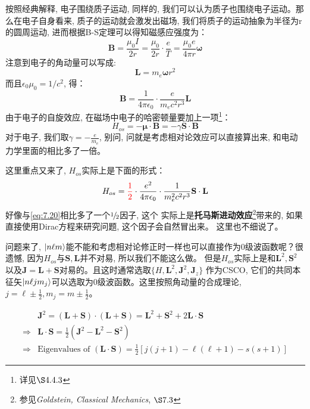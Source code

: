 \documentclass[a4paper,zihao=-4,linespread=1]{ctexrep}
\begin{document}
    按照经典解释, 电子围绕质子运动, 同样的, 我们可以认为质子也围绕电子运动。那么在电子自身看来, 质子的运动就会激发出磁场, 我们将质子的运动抽象为半径为r的圆周运动,
    进而根据B-S定理可以得知磁感应强度为：
    \begin{equation}
        \mathbf{B}=\frac{\mu_0I}{2r}=\frac{\mu_0}{2r}\cdot\frac{e}{T}=\frac{\mu_0e}{4\pi r}\mathbf{\omega}
    \end{equation}
    注意到电子的角动量可以写成:
    \[\mathbf{L}=m_e\mathbf{\omega}r^2\]
    而且$\epsilon_0\mu_0=1/c^2$, 得：
    \begin{equation}
        \mathbf{B}=\frac{1}{4\pi\epsilon_0}\cdot\frac{e}{m_ec^2r^3}\mathbf{L}
    \end{equation}
    由于电子的自旋效应, 在磁场中电子的哈密顿量要加上一项\footnote{详见$\S4.4.3$}：
    \begin{equation}
        \label{eq:7.20}
        H_{os}=-\mathbf{\mu}\cdot\mathbf{B}=-\gamma \mathbf{S}\cdot\mathbf{B}
    \end{equation}
    对于电子, 我们取$\gamma=-\frac{e}{m_e}$, 别问, 问就是考虑相对论效应可以直接算出来, 和电动力学里面的相比多了一倍。

    这里重点又来了, $H_{os}$实际上是下面的形式：
    \begin{equation}
    	\label{eq:7.22}
        H_{os}={\color{red} \frac{1}{2}}\cdot\frac{e^2}{4\pi\epsilon_0}\cdot\frac{1}{m_e^2c^2r^3}\mathbf{S}\cdot\mathbf{L}
    \end{equation}
    好像与\ref{eq:7.20}相比多了一个${\raise0.5ex\hbox{$\scriptstyle 1$}\kern-0.1em/\kern-0.15em\lower0.25ex\hbox{$\scriptstyle 2$}}$因子, 这个
    实际上是\textbf{托马斯进动效应}\footnote{参见{\itshape Goldstein, Classical Mechanics}, $\S7.3$}带来的, 如果直接使用Dirac方程来研究问题, 这个因子会自然冒出来。
    这里也不细说了。

    问题来了, $\ket{n\ell m}$能不能和考虑相对论修正时一样也可以直接作为0级波函数呢？很遗憾, 因为$H_{os}$与$\mathbf{S},\mathbf{L}$并不对易, 所以我们不能这么做。
    但是$H_{os}$实际上是和$\mathbf{L}^2,\mathbf{S}^2$以及$\mathbf{J}=\mathbf{L}+\mathbf{S}$对易的。且这时通常选取$\{H,\mathbf{L}^2,\mathbf{J}^2,\mathbf{J}_z\}$
    作为CSCO, 它们的共同本征矢$\ket{n\ell j m_j}$可以选取为0级波函数。这里按照角动量的合成理论, $j=\ell\pm\frac{1}{2}, m_j=m\pm\frac{1}{2}$。

    \begin{align*}
        &\mathbf{J}^2=\left(\mathbf{L}+\mathbf{S}\right)\cdot\left(\mathbf{L}+\mathbf{S}\right)=\mathbf{L}^2+\mathbf{S}^2+2\mathbf{L}\cdot\mathbf{S}\\
        \Rightarrow&\mathbf{L}\cdot\mathbf{S}=\frac{1}{2}\left(\mathbf{J}^2-\mathbf{L}^2-\mathbf{S}^2\right)\\
        \Rightarrow&\text{Eigenvalues of }\left(\mathbf{L}\cdot\mathbf{S}\right)=\frac{1}{2}\left[j(j+1)-\ell(\ell+1)-s(s+1)\right]
    \end{align*}
\end{document}
